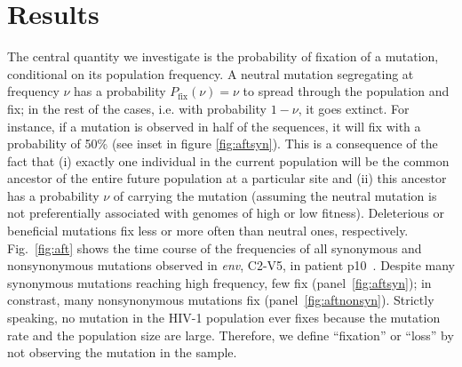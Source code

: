 \documentclass[rmp, twocolumn]{revtex4}
\newcommand{\pfix}{P_{\mathrm{fix}}}
\newcommand{\FIG}[1]{Fig.~\ref{fig:#1}}
\newcommand{\env}{\textit{env}}
\newcommand{\shankaregion}{C2-V5}
\begin{document}
\section{Results}
The central quantity we investigate is the probability of fixation of a
mutation, conditional on its population frequency. A neutral mutation
segregating at frequency $\nu$ has a probability $\pfix(\nu) = \nu$ to
spread through the population and fix; in the rest of the cases, i.e. with
probability $1-\nu$, it goes extinct. For instance, if a mutation is observed in
half of the sequences, it will fix with a probability of 50\% (see inset in
figure \ref{fig:aftsyn}).
This is a  consequence of the fact that (i) exactly one
individual in the current population will be the common ancestor of the entire
future population at a particular site and (ii) this ancestor has a probability
$\nu$ of carrying the mutation (assuming the neutral mutation is not
preferentially associated with genomes of high or low fitness). Deleterious or
beneficial mutations fix less or more often than neutral ones, respectively.
\FIG{aft} shows the time course of the frequencies of all synonymous and
nonsynonymous mutations observed in \env, \shankaregion, in patient
p10~\citep{shankarappa_consistent_1999}. Despite many synonymous
mutations reaching high frequency, few fix (panel~\ref{fig:aftsyn}); in
constrast, many nonsynonymous mutations fix (panel~\ref{fig:aftnonsyn}).
Strictly speaking, no mutation in the HIV-1 population ever fixes because the 
mutation rate and the population size are large. Therefore, we define ``fixation'' or ``loss''
by not observing the mutation in the sample.

\end{document}
